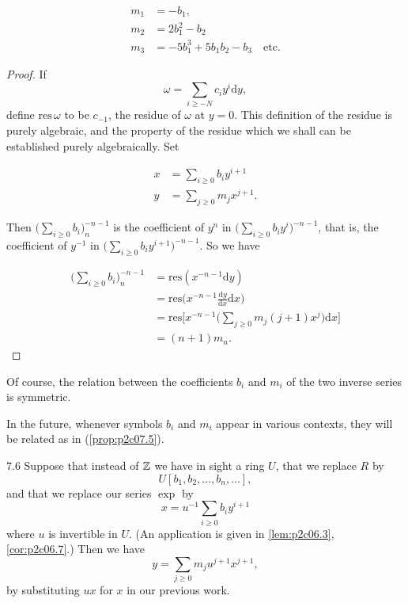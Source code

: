 \documentclass[../main]{subfiles}
\begin{document}
\begin{examples}
\begin{align*}
m_1 & = -b_1, \\ m_2 & = 2 b_1^2 - b_2 \\ m_3 & = -5b_1^3 + 5b_1b_2 - b_3 \quad \text{etc.}
\end{align*}
\end{examples}

\begin{proof}
If \[\omega = \sum_{i \ge -N} c_i y^i \mathrm d y,\] define $\mathrm{res} \, \omega$ to be $c_{-1}$, the residue of $\omega$ at $y=0$. This definition of the residue is purely algebraic, and the property of the residue which we shall can be established purely algebraically. Set

\begin{align*}
x & = \sum_{i \ge 0} b_i y^{i + 1} \\ y & = \sum_{j \ge 0} m_j x^{j + 1}.
\end{align*}

Then $\displaystyle \bigg(\sum_{i \ge 0} b_i\bigg)_n^{-n - 1}$ is the coefficient of $y^n$ in $\displaystyle \bigg(\sum_{i \ge 0} b_i y^i\bigg)^{-n - 1}$, that is, the coefficient of $y^{-1}$ in $\displaystyle \bigg(\sum_{i \ge 0} b_i y^{i + 1}\bigg)^{-n - 1}$. So we have 

\begin{align*}
\bigg(\sum_{i \ge 0} b_i\bigg)_n^{-n - 1} & = \mathrm{res}(x^{-n - 1} \mathrm dy) \\ & = \mathrm{res} \bigg(x^{-n - 1} \frac {\mathrm dy} {\mathrm dx} \mathrm dx\bigg) \\ & = \mathrm{res} \bigg[x^{-n - 1} \bigg(\sum_{j \ge 0} m_j (j + 1) x^j\bigg) \mathrm dx\bigg] \\ & = (n + 1)m_n.
\end{align*}
\end{proof}

Of course, the relation between the coefficients $b_i$ and $m_i$ of the two inverse series is symmetric.

In the future, whenever symbols $b_i$ and $m_i$ appear in various contexts, they will be related as in (\ref{prop:p2c07.5}).

\begin{customremark}{7.6}\label{rem:p2c07.6}
Suppose that instead of $\mathbb{Z}$ we have in sight a ring $U$, that we replace $R$ by \[U[b_1, b_2, \ldots, b_n, \ldots],\] and that we replace our series $\exp$ by \[x = u^{-1} \sum_{i \ge 0} b_i y^{i + 1}\] where $u$ is invertible in $U$. (An application is given in \eqref{lem:p2c06.3}, \eqref{cor:p2c06.7}.) Then we have \[y = \sum_{j \ge 0} m_j u^{j + 1} x^{j + 1},\] by substituting $u x$ for $x$ in our previous work.
\end{customremark}
\end{document}
